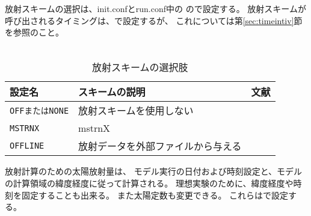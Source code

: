 \\


\subsection{\SubsecRadiationSetting} \label{subsec:basic_usel_radiation}
放射スキームの選択は、init.confとrun.conf中の
ので設定する。
放射スキームが呼び出されるタイミングは、で設定するが、
これについては第\ref{sec:timeintiv}節を参照のこと。\\

\\

\begin{table}[h]
\begin{center}
  \caption{放射スキームの選択肢}
  \label{tab:nml_atm_rd}
  \begin{tabularx}{150mm}{lXX} \hline
    \rowcolor[gray]{0.9}  設定名 & スキームの説明 & 文献\\ \hline
      \verb|OFFまたはNONE| & 放射スキームを使用しない & \\
      \verb|MSTRNX|       & mstrnX & \citet{sekiguchi_2008} \\
      \verb|OFFLINE|      & 放射データを外部ファイルから与える & \\
    \hline
  \end{tabularx}
\end{center}
\end{table}

放射計算のための太陽放射量は、
モデル実行の日付および時刻設定と、モデルの計算領域の緯度経度に従って計算される。
理想実験のために、緯度経度や時刻を固定することも出来る。
また太陽定数も変更できる。
これらはで設定する。\\

